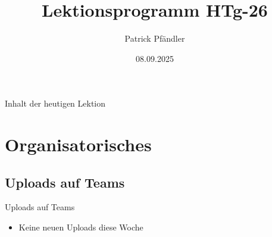 



\title{\textbf{Lektionsprogramm HTg-26}}
\author{Patrick Pfändler}



\date{08.09.2025}




\frame{\titlepage}





\begin{frame}{Inhalt der heutigen Lektion}
    \tableofcontents
\end{frame}


\section{Organisatorisches}
\BlueSectionSlide

\subsection{Uploads auf Teams}
\begin{frame}{Uploads auf Teams}
    \begin{itemize}
        \item[\textbullet] Keine neuen Uploads diese Woche
    \end{itemize}
\end{frame}

